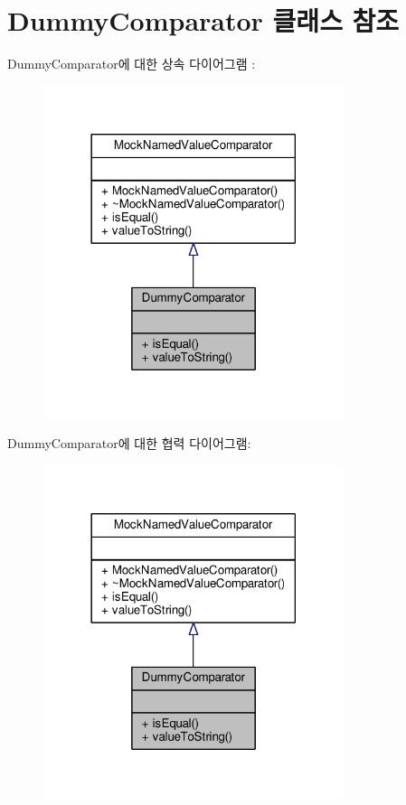 \hypertarget{class_dummy_comparator}{}\section{Dummy\+Comparator 클래스 참조}
\label{class_dummy_comparator}


Dummy\+Comparator에 대한 상속 다이어그램 \+: 
\nopagebreak
\begin{figure}[H]
\begin{center}
\leavevmode
\includegraphics[width=249pt]{class_dummy_comparator__inherit__graph}
\end{center}
\end{figure}


Dummy\+Comparator에 대한 협력 다이어그램\+:
\nopagebreak
\begin{figure}[H]
\begin{center}
\leavevmode
\includegraphics[width=249pt]{class_dummy_comparator__coll__graph}
\end{center}
\end{figure}
